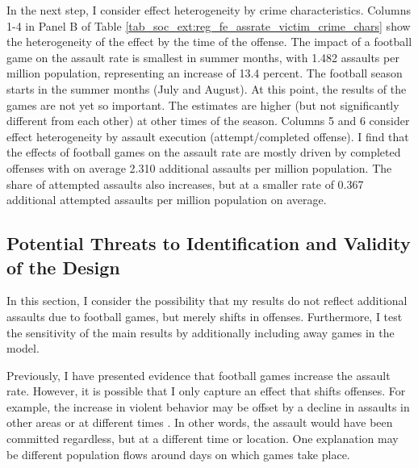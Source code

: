 

In the next step, I consider effect heterogeneity by crime characteristics. Columns 1-4 in Panel B of Table \ref{tab_soc_ext:reg_fe_assrate_victim_crime_chars} show the heterogeneity of the effect by the time of the offense. The impact of a football game on the assault rate is smallest in summer months, with 1.482 assaults per million population, representing an increase of 13.4 percent. The football season starts in the summer months (July and August). At this point, the results of the games are not yet so important. The estimates are higher (but not significantly different from each other) at other times of the season. Columns 5 and 6 consider effect heterogeneity by assault execution (attempt/completed offense). I find that the effects of football games on the assault rate are mostly driven by completed offenses with on average 2.310 additional assaults per million population. The share of attempted assaults also increases, but at a smaller rate of 0.367 additional attempted assaults per million population on average.




\subsection{Potential Threats to Identification and Validity of the Design}\label{sec_soc_ext: threats}
In this section, I consider the possibility that my results do not reflect additional assaults due to football games, but merely shifts in offenses. Furthermore, I test the sensitivity of the main results by additionally including away games in the model.

Previously, I have presented evidence that football games increase the assault rate. However, it is possible that I only capture an effect that shifts offenses. For example, the increase in violent behavior may be offset by a decline in assaults in other areas or at different times \citep{lindo2018college}. In other words, the assault would have been committed regardless, but at a different time or location. One explanation may be different population flows around days on which games take place.



